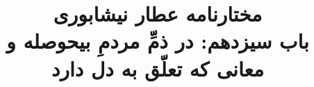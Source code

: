 \documentclass[14pt,b5paper]{article}
\begin{document}
\title{\Huge مختارنامه عطار نیشابوری \\
باب سیزدهم: در ذمِّ مردمِ ب‍یحوصله و معانی که تعلّق به دل دارد}
\author{ }
\date{ }
\maketitle
\newpage
\tableofcontents
\newpage

\newpage

\newpage

\newpage

\newpage

\newpage

\newpage

\newpage

\newpage

\newpage

\newpage

\newpage

\newpage

\newpage

\newpage

\newpage

\newpage

\newpage

\newpage

\newpage

\newpage

\newpage

\newpage

\newpage

\newpage

\newpage

\newpage

\newpage

\newpage

\newpage

\newpage
\end{document}

